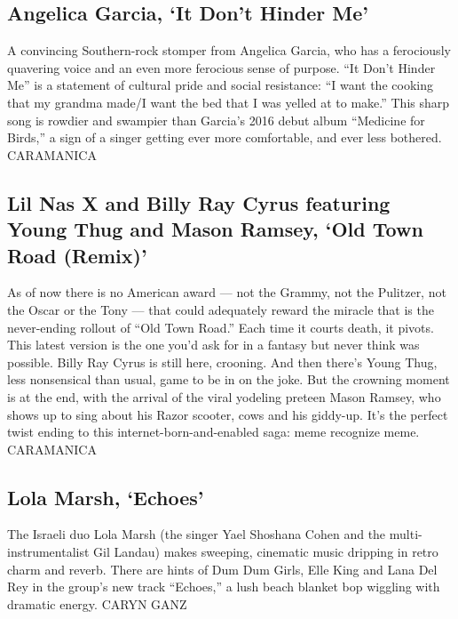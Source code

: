 \hypertarget{angelica-garcia-it-dont-hinder-me}{%
\subsection{Angelica Garcia, `It Don't Hinder
Me'}\label{angelica-garcia-it-dont-hinder-me}}

A convincing Southern-rock stomper from Angelica Garcia, who has a
ferociously quavering voice and an even more ferocious sense of purpose.
``It Don't Hinder Me'' is a statement of cultural pride and social
resistance: ``I want the cooking that my grandma made/I want the bed
that I was yelled at to make.'' This sharp song is rowdier and swampier
than Garcia's 2016 debut album ``Medicine for Birds,'' a sign of a
singer getting ever more comfortable, and ever less bothered. CARAMANICA

\hypertarget{lil-nas-x-and-billy-ray-cyrus-featuring-young-thug-and-mason-ramsey-old-town-road-remix}{%
\subsection{Lil Nas X and Billy Ray Cyrus featuring Young Thug and Mason
Ramsey, `Old Town Road
(Remix)'}\label{lil-nas-x-and-billy-ray-cyrus-featuring-young-thug-and-mason-ramsey-old-town-road-remix}}

As of now there is no American award --- not the Grammy, not the
Pulitzer, not the Oscar or the Tony --- that could adequately reward the
miracle that is the never-ending rollout of ``Old Town Road.'' Each time
it courts death, it pivots. This latest version is the one you'd ask for
in a fantasy but never think was possible. Billy Ray Cyrus is still
here, crooning. And then there's Young Thug, less nonsensical than
usual, game to be in on the joke. But the crowning moment is at the end,
with the arrival of the viral yodeling preteen Mason Ramsey, who shows
up to sing about his Razor scooter, cows and his giddy-up. It's the
perfect twist ending to this internet-born-and-enabled saga: meme
recognize meme. CARAMANICA

\hypertarget{lola-marsh-echoes}{%
\subsection{Lola Marsh, `Echoes'}\label{lola-marsh-echoes}}

The Israeli duo Lola Marsh (the singer Yael Shoshana Cohen and the
multi-instrumentalist Gil Landau) makes sweeping, cinematic music
dripping in retro charm and reverb. There are hints of Dum Dum Girls,
Elle King and Lana Del Rey in the group's new track ``Echoes,'' a lush
beach blanket bop wiggling with dramatic energy. CARYN GANZ

